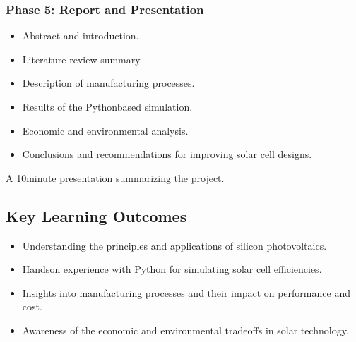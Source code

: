 \documentclass[letterpaper,10pt,english]{jupyterBook}
\begin{document}
\subsubsection{Phase 5: Report and Presentation}
\label{\detokenize{ProjectInstructions:phase-5-report-and-presentation}}
\sphinxAtStartPar
{}
\begin{itemize}
\item {} 
\sphinxAtStartPar
Abstract and introduction.

\item {} 
\sphinxAtStartPar
Literature review summary.

\item {} 
\sphinxAtStartPar
Description of manufacturing processes.

\item {} 
\sphinxAtStartPar
Results of the Python\sphinxhyphen{}based simulation.

\item {} 
\sphinxAtStartPar
Economic and environmental analysis.

\item {} 
\sphinxAtStartPar
Conclusions and recommendations for improving solar cell designs.

\end{itemize}

\sphinxAtStartPar
{} A 10\sphinxhyphen{}minute presentation summarizing the project.


\subsection{Key Learning Outcomes}
\label{\detokenize{ProjectInstructions:key-learning-outcomes}}\begin{itemize}
\item {} 
\sphinxAtStartPar
Understanding the principles and applications of silicon
photovoltaics.

\item {} 
\sphinxAtStartPar
Hands\sphinxhyphen{}on experience with Python for simulating solar cell
efficiencies.

\item {} 
\sphinxAtStartPar
Insights into manufacturing processes and their impact on
performance and cost.

\item {} 
\sphinxAtStartPar
Awareness of the economic and environmental trade\sphinxhyphen{}offs in solar
technology.

\end{itemize}
\end{document}
